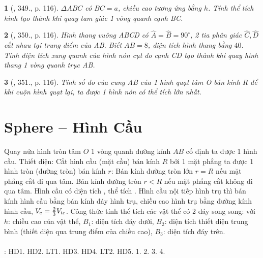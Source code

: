 \documentclass{article}
\newtheorem{baitoan}{}
\begin{document}
\begin{baitoan}[\cite{Binh_Toan_9_tap_2}, 349., p. 116]
	$\Delta ABC$ có $BC = a$, chiều cao tương ứng bằng $h$. Tính thể tích hình tạo thành khi quay tam giác 1 vòng quanh cạnh BC.
\end{baitoan}

\begin{baitoan}[\cite{Binh_Toan_9_tap_2}, 350., p. 116]
	Hình thang vuông ABCD có $\widehat{A} = \widehat{B} = 90^\circ$, 2 tia phân giác $\widehat{C},\widehat{D}$ cắt nhau tại trung điểm của AB. Biết $AB = 8$, diện tích hình thang bằng $40$. Tính diện tích xung quanh của hình nón cụt do cạnh CD tạo thành khi quay hình thang 1 vòng quanh trục AB.
\end{baitoan}

\begin{baitoan}[\cite{Binh_Toan_9_tap_2}, 351., p. 116]
	Tính số đo của cung AB của 1 hình quạt tâm O bán kính R để khi cuộn hình quạt lại, ta được 1 hình nón có thể tích lớn nhất.
\end{baitoan}


\section{Sphere -- Hình Cầu}

\begin{center}
\end{center}
 Quay nửa hình tròn tâm $O$ 1 vòng quanh đường kính $AB$ cố định ta được 1 hình cầu.  {\sf Thiết diện}: Cắt hình cầu (mặt cầu) bán kính $R$ bởi 1 mặt phẳng ta được 1 hình tròn (đường tròn) bán kính $r$: Bán kính đường tròn lớn $r = R$ nếu mặt phẳng cắt đi qua tâm. Bán kính đường tròn $r < R$ nếu mặt phẳng cắt không đi qua tâm.  Hình cầu có diện tích , thể tích .  Hình cầu nội tiếp hình trụ thì bán kính hình cầu bằng bán kính đáy hình trụ, chiều cao hình trụ bằng đường kính hình cầu, $V_{\rm c} = \frac{2}{3}V_{\rm tr}$.  {\sf Công thức tính thể tích các vật thể có 2 đáy song song}:  với $h$: chiều cao của vật thể, $B_1$: diện tích đáy dưới, $B_2$: diện tích thiết diện trung bình (thiết diện qua trung điểm của chiều cao), $B_3$: diện tích đáy trên.\\
\\
\cite[Chap. X, \S3, pp. 104--108]{SGK_Toan_9_Canh_Dieu_tap_1}: HD1. HD2. LT1. HD3. HD4. LT2. HD5. 1. 2. 3. 4.
\end{document}
